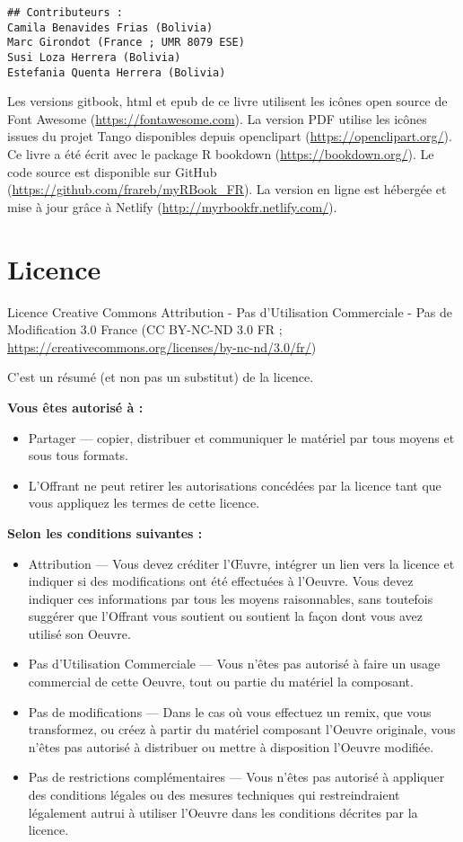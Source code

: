 \documentclass[]{book}
\providecommand{\tightlist}{%
  \setlength{\itemsep}{0pt}\setlength{\parskip}{0pt}}
\theoremstyle{definition}
\theoremstyle{definition}
\theoremstyle{definition}
\theoremstyle{remark}
\begin{document}
\begin{verbatim}
## Contributeurs :
Camila Benavides Frias (Bolivia)
Marc Girondot (France ; UMR 8079 ESE)
Susi Loza Herrera (Bolivia)
Estefania Quenta Herrera (Bolivia)
\end{verbatim}

Les versions gitbook, html et epub de ce livre utilisent les icônes open
source de Font Awesome (\url{https://fontawesome.com}). La version PDF
utilise les icônes issues du projet Tango disponibles depuis openclipart
(\url{https://openclipart.org/}). Ce livre a été écrit avec le package R
bookdown (\url{https://bookdown.org/}). Le code source est disponible
sur GitHub (\url{https://github.com/frareb/myRBook_FR}). La version en
ligne est hébergée et mise à jour grâce à Netlify
(\url{http://myrbookfr.netlify.com/}).

\chapter{Licence}\label{licence}

Licence Creative Commons Attribution - Pas d'Utilisation Commerciale -
Pas de Modification 3.0 France (CC BY-NC-ND 3.0 FR ;
\url{https://creativecommons.org/licenses/by-nc-nd/3.0/fr/})

C'est un résumé (et non pas un substitut) de la licence.

\textbf{Vous êtes autorisé à :}

\begin{itemize}
\tightlist
\item
  Partager --- copier, distribuer et communiquer le matériel par tous
  moyens et sous tous formats.
\item
  L'Offrant ne peut retirer les autorisations concédées par la licence
  tant que vous appliquez les termes de cette licence.
\end{itemize}

\textbf{Selon les conditions suivantes :}

\begin{itemize}
\item
  Attribution --- Vous devez créditer l'Œuvre, intégrer un lien vers la
  licence et indiquer si des modifications ont été effectuées à
  l'Oeuvre. Vous devez indiquer ces informations par tous les moyens
  raisonnables, sans toutefois suggérer que l'Offrant vous soutient ou
  soutient la façon dont vous avez utilisé son Oeuvre.
\item
  Pas d'Utilisation Commerciale --- Vous n'êtes pas autorisé à faire un
  usage commercial de cette Oeuvre, tout ou partie du matériel la
  composant.
\item
  Pas de modifications --- Dans le cas où vous effectuez un remix, que
  vous transformez, ou créez à partir du matériel composant l'Oeuvre
  originale, vous n'êtes pas autorisé à distribuer ou mettre à
  disposition l'Oeuvre modifiée.
\item
  Pas de restrictions complémentaires --- Vous n'êtes pas autorisé à
  appliquer des conditions légales ou des mesures techniques qui
  restreindraient légalement autrui à utiliser l'Oeuvre dans les
  conditions décrites par la licence.
\end{itemize}
\end{document}
